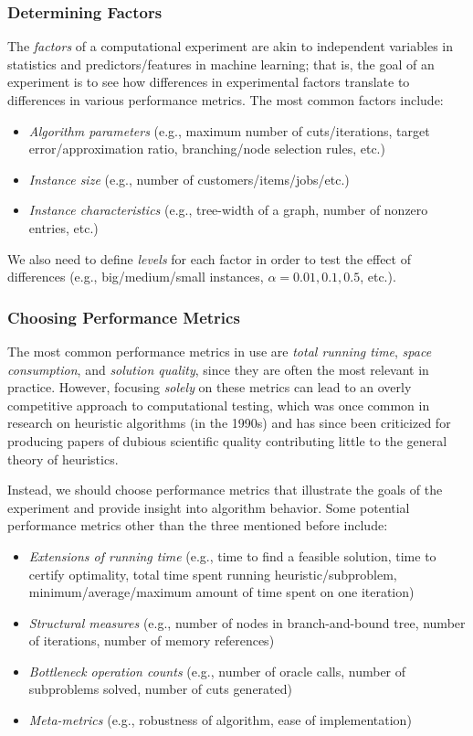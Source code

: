 \documentclass[12pt]{article}
\begin{document}
\subsubsection{Determining Factors}
The \emph{factors} of a computational experiment are akin to independent variables in statistics and predictors/features in machine learning; that is, the goal of an experiment is to see how differences in experimental factors translate to differences in various performance metrics. The most common factors include:
\begin{itemize}
    \item \emph{Algorithm parameters} (e.g., maximum number of cuts/iterations, target error/approximation ratio, branching/node selection rules, etc.)
    \item \emph{Instance size} (e.g., number of customers/items/jobs/etc.)
    \item \emph{Instance characteristics} (e.g., tree-width of a graph, number of nonzero entries, etc.)
\end{itemize}
We also need to define \emph{levels} for each factor in order to test the effect of differences (e.g., big/medium/small instances, $\alpha = 0.01, 0.1, 0.5$, etc.).

\subsubsection{Choosing Performance Metrics}
The most common performance metrics in use are \emph{total running time}, \emph{space consumption}, and \emph{solution quality}, since they are often the most relevant in practice. However, focusing \emph{solely} on these metrics can lead to an overly competitive approach to computational testing, which was once common in research on heuristic algorithms (in the 1990s) and has since been criticized \cite{hooker1995testing,sorensen2015metaheuristics} for producing papers of dubious scientific quality contributing little to the general theory of heuristics.

Instead, we should choose performance metrics that illustrate the goals of the experiment and provide insight into algorithm behavior.  Some potential performance metrics other than the three mentioned before include:
\begin{itemize}
    \item \emph{Extensions of running time} (e.g., time to find a feasible solution, time to certify optimality, total time spent running heuristic/subproblem, minimum/average/maximum amount of time spent on one iteration)
    \item \emph{Structural measures} (e.g., number of nodes in branch-and-bound tree, number of iterations, number of memory references)
    \item \emph{Bottleneck operation counts} (e.g., number of oracle calls, number of subproblems solved, number of cuts generated)
    \item \emph{Meta-metrics} (e.g., robustness of algorithm, ease of implementation)
\end{itemize}
\end{document}

